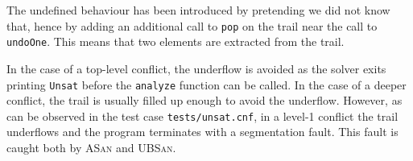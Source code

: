 The undefined behaviour has been introduced by pretending we did not know that, hence by adding an additional call to \texttt{pop} on the trail near the call to \texttt{undoOne}. This means that two elements are extracted from the trail.

In the case of a top-level conflict, the underflow is avoided as the solver exits printing \texttt{Unsat} before the \texttt{analyze} function can be called. In the case of a deeper conflict, the trail is usually filled up enough to avoid the underflow. However, as can be observed in the test case \texttt{tests/unsat.cnf}, in a level-1 conflict the trail underflows and the program terminates with a segmentation fault. This fault is caught both by \textsc{ASan} and \textsc{UBSan}.
    

